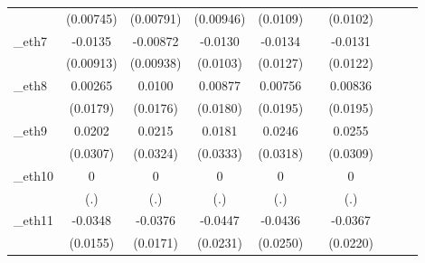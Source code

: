 \begin{table}[htbp]
\begin{tabular}{l*{9}{c}}
            &   (0.00745)         &   (0.00791)         &   (0.00946)         &    (0.0109)         &                     &    (0.0102)         &                     &                     &                     \\
[1em]
\_eth7       &     -0.0135         &    -0.00872         &     -0.0130         &     -0.0134         &                     &     -0.0131         &                     &                     &                     \\
            &   (0.00913)         &   (0.00938)         &    (0.0103)         &    (0.0127)         &                     &    (0.0122)         &                     &                     &                     \\
[1em]
\_eth8       &     0.00265         &      0.0100         &     0.00877         &     0.00756         &                     &     0.00836         &                     &                     &                     \\
            &    (0.0179)         &    (0.0176)         &    (0.0180)         &    (0.0195)         &                     &    (0.0195)         &                     &                     &                     \\
[1em]
\_eth9       &      0.0202         &      0.0215         &      0.0181         &      0.0246         &                     &      0.0255         &                     &                     &                     \\
            &    (0.0307)         &    (0.0324)         &    (0.0333)         &    (0.0318)         &                     &    (0.0309)         &                     &                     &                     \\
[1em]
\_eth10      &           0         &           0         &           0         &           0         &                     &           0         &                     &                     &                     \\
            &         (.)         &         (.)         &         (.)         &         (.)         &                     &         (.)         &                     &                     &                     \\
[1em]
\_eth11      &     -0.0348\sym{**} &     -0.0376\sym{**} &     -0.0447\sym{*}  &     -0.0436\sym{*}  &                     &     -0.0367\sym{*}  &                     &                     &                     \\
            &    (0.0155)         &    (0.0171)         &    (0.0231)         &    (0.0250)         &                     &    (0.0220)         &                     &                     &                     \\

\end{tabular}
\end{table}

